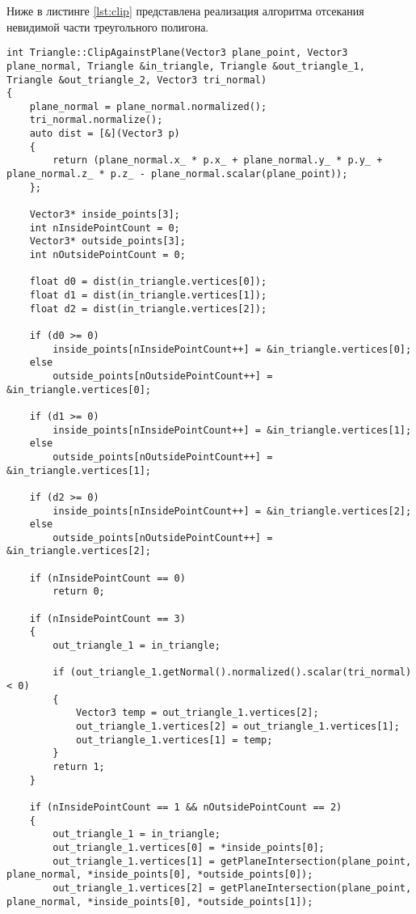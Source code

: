 Ниже в листинге \ref{lst:clip} представлена реализация алгоритма отсекания невидимой части треугольного полигона.

\begin{lstlisting}[caption = Реализация общего алгоритма отрисовки, label = lst:clip]
int Triangle::ClipAgainstPlane(Vector3 plane_point, Vector3 plane_normal, Triangle &in_triangle, Triangle &out_triangle_1, Triangle &out_triangle_2, Vector3 tri_normal)
{
    plane_normal = plane_normal.normalized();
    tri_normal.normalize();
    auto dist = [&](Vector3 p)
    {
        return (plane_normal.x_ * p.x_ + plane_normal.y_ * p.y_ + plane_normal.z_ * p.z_ - plane_normal.scalar(plane_point));
    };

    Vector3* inside_points[3];
    int nInsidePointCount = 0;
    Vector3* outside_points[3];
    int nOutsidePointCount = 0;

    float d0 = dist(in_triangle.vertices[0]);
    float d1 = dist(in_triangle.vertices[1]);
    float d2 = dist(in_triangle.vertices[2]);

    if (d0 >= 0)
        inside_points[nInsidePointCount++] = &in_triangle.vertices[0];
    else
        outside_points[nOutsidePointCount++] = &in_triangle.vertices[0];

    if (d1 >= 0)
        inside_points[nInsidePointCount++] = &in_triangle.vertices[1];
    else
        outside_points[nOutsidePointCount++] = &in_triangle.vertices[1];

    if (d2 >= 0)
        inside_points[nInsidePointCount++] = &in_triangle.vertices[2];
    else
        outside_points[nOutsidePointCount++] = &in_triangle.vertices[2];

    if (nInsidePointCount == 0)
        return 0;

    if (nInsidePointCount == 3)
    {
        out_triangle_1 = in_triangle;

        if (out_triangle_1.getNormal().normalized().scalar(tri_normal) < 0)
        {
            Vector3 temp = out_triangle_1.vertices[2];
            out_triangle_1.vertices[2] = out_triangle_1.vertices[1];
            out_triangle_1.vertices[1] = temp;
        }
        return 1;
    }

    if (nInsidePointCount == 1 && nOutsidePointCount == 2)
    {
        out_triangle_1 = in_triangle;
        out_triangle_1.vertices[0] = *inside_points[0];
        out_triangle_1.vertices[1] = getPlaneIntersection(plane_point, plane_normal, *inside_points[0], *outside_points[0]);
        out_triangle_1.vertices[2] = getPlaneIntersection(plane_point, plane_normal, *inside_points[0], *outside_points[1]);


\end{lstlisting}

